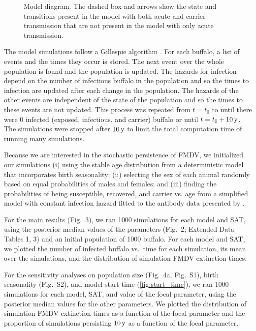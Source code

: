 \documentclass[12pt, USenglish]{article}  %
\begin{document}
\begin{figure}
  \centering
  \textsf{}
  \caption{Model diagram. The dashed box and arrows show the
    state and transitions present in the model with both acute and
    carrier transmission that are not present in the model with only
    acute transmission.}
  \label{fig:diagram}
\end{figure}


The model simulations follow a Gillespie algorithm
\autocite{gillespie_1977}. For each buffalo, a list of events and the
times they occur is stored. The next event over the whole population
is found and the population is updated.  The hazards for infection
depend on the number of infectious buffalo in the population and so
the times to infection are updated after each change in the
population.  The hazards of the other events are independent of the
state of the population and so the times to these events are not
updated.  This process was repeated from $t = t_0$ to until there were
$0$ infected (exposed, infectious, and carrier) buffalo or until
$t = t_0 + \unit[10]{y}$. The simulations were stopped after
$\unit[10]{y}$ to limit the total computation time of running many
simulations.

Because we are interested in the stochastic persistence of FMDV, we
initialized our simulations (i) using the stable age distribution from
a deterministic model that incorporates birth seasonality; (ii)
selecting the sex of each animal randomly based on equal probabilities
of males and females; and (iii) finding the probabilities of being
susceptible, recovered, and carrier vs. age from a simplified model
with constant infection hazard fitted to the antibody data presented
by \citeauthor{hedger_1972} \autocite{hedger_1972}.

For the main results (Fig.~3), we ran 1000 simulations for each model
and SAT, using the posterior median values of the parameters (Fig.~2;
Extended Data Tables 1, 3) and an initial population of 1000
buffalo. For each model and SAT, we plotted the number of infected
buffalo vs.~time for each simulation, its mean over the simulations,
and the distribution of simulation FMDV extinction times.

For the sensitivity analyses on population size (Fig.~4a, Fig.~S1),
birth seasonality (Fig.~S2), and model start time
(\autoref{fig:start_time}), we ran 1000 simulations for each model,
SAT, and value of the focal parameter, using the posterior median
values for the other parameters. We plotted the distribution of
simulation FMDV extinction times as a function of the focal parameter
and the proportion of simulations persisting $\unit[10]{y}$ as a
function of the focal parameter.
\end{document}

